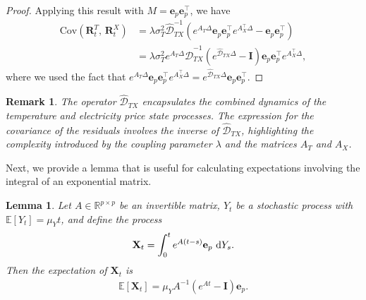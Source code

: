 \documentclass[10pt,a4paper,reqno]{amsart}
\newtheorem{lemma}[theorem]{Lemma}
\newtheorem{remark}[theorem]{Remark}
\theoremstyle{example}
\newcommand{\Cov}{\mathrm{Cov}}
\newcommand*\D{\mathop{}\!\textnormal{d}}
\begin{document}
\begin{proof}
Applying this result with $M = \mathbf{e}_p \mathbf{e}_p^\top$, we have
\begin{align*}
\Cov\left( \mathbf{R}_t^T,\, \mathbf{R}_t^X \right) &= \lambda \sigma_T^2 \hat{\mathcal{D}}_{TX}^{-1} \left( e^{A_T \Delta} \mathbf{e}_p \mathbf{e}_p^\top e^{A_X^\top \Delta} - \mathbf{e}_p \mathbf{e}_p^\top \right) \\
&= \lambda \sigma_T^2 e^{A_T \Delta} \hat{\mathcal{D}}_{TX}^{-1} \left( e^{\hat{\mathcal{D}}_{TX} \Delta} - \mathbf{I} \right) \mathbf{e}_p \mathbf{e}_p^\top e^{A_X^\top \Delta},
\end{align*}
where we used the fact that $e^{A_T \Delta} \mathbf{e}_p \mathbf{e}_p^\top e^{A_X^\top \Delta} = e^{\hat{\mathcal{D}}_{TX} \Delta} \mathbf{e}_p \mathbf{e}_p^\top$.
\end{proof}

\begin{remark}
The operator $\hat{\mathcal{D}}_{TX}$ encapsulates the combined dynamics of the temperature and electricity price state processes. The expression for the covariance of the residuals involves the inverse of $\hat{\mathcal{D}}_{TX}$, highlighting the complexity introduced by the coupling parameter $\lambda$ and the matrices $A_T$ and $A_X$.
\end{remark}

Next, we provide a lemma that is useful for calculating expectations involving the integral of an exponential matrix.

\begin{lemma}\label{lem:expected_integral}
Let $A \in \mathbb{R}^{p \times p}$ be an invertible matrix, $Y_t$ be a stochastic process with $\mathbb{E}[Y_t] = \mu_Y t$, and define the process
\begin{align}
\mathbf{X}_t = \int_0^t e^{A (t - s)} \mathbf{e}_p \, \D Y_s. \label{eq:process_X_t}
\end{align}
Then the expectation of $\mathbf{X}_t$ is
\begin{align}
\mathbb{E}[\mathbf{X}_t] = \mu_Y A^{-1} \left( e^{A t} - \mathbf{I} \right) \mathbf{e}_p. \label{eq:expected_X_t}
\end{align}
\end{lemma}
\end{document}
